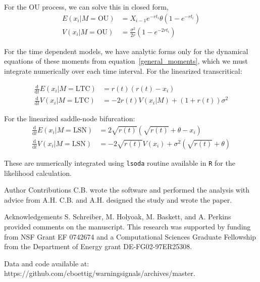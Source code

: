 \documentclass{pnastwo}
\newcommand{\ud}{\mathrm{d}}
\begin{document}
\begin{article}
For the OU process, we can solve this in closed form, 
\begin{align}
  E(x_i| M = \text{OU}) &= X_{i-1} e^{-r t_i} \theta \left(1 - e^{-rt_i} \right) \\
V(x_i| M = \text{OU}) &= \frac{\sigma^2}{2 r} \left(1 - e^{-2 r t_i} \right)
\label{OUsoln}
\end{align}

For the time dependent models, we have analytic forms only for the dynamical equations of these moments from equation~\eqref{general_moments}, which we must integrate numerically over each time interval. For the linearized transcritical:

\begin{align}
\frac{\ud }{\ud t} E(x_i| M = \text{LTC})&=  r(t)(r(t) - x_i) \\
\frac{\ud}{\ud t} V(x_i| M = \text{LTC}) &=  -2 r(t) V(x_i|M) + (1+r(t))\sigma^2 
\label{LTCsoln}
\end{align}

For the linearized saddle-node bifurcation:
\begin{align}
\frac{\ud }{\ud t} E(x_i| M = \text{LSN})&=  2\sqrt{r(t)}(\sqrt{r(t)}+\theta - x_i) \\
\frac{\ud}{\ud t} V(x_i| M = \text{LSN}) &=  -2 \sqrt{r(t)} V(x_i) + \sigma^2 ( \sqrt{r(t)}+\theta )
\label{LSNsoln}
\end{align}

These are numerically integrated using \texttt{lsoda} routine available in \texttt{R} for the likelihood calculation.  

                           

                             \begin{acknowledgments}

Author Contributions
C.B. wrote the software and performed the analysis with advice from A.H.  C.B. and A.H. designed the study and wrote the paper.  

Acknowledgements
S. Schreiber, M. Holyoak, M. Baskett, and A. Perkins provided comments on the manuscript.  This research was supported by funding from NSF Grant EF 0742674 and a Computational Sciences Graduate Fellowship from the Department of Energy grant DE-FG02-97ER25308.

Data and code available at: https://github.com/cboettig/warningsignals/archives/master. 
                             \end{acknowledgments}


\end{article}
\end{document}
